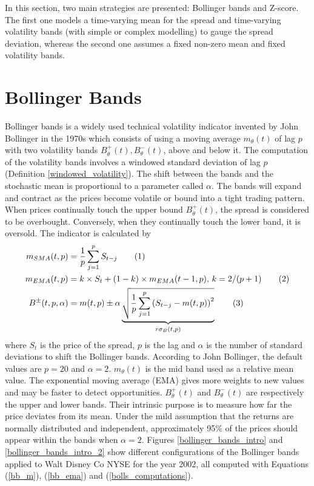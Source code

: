\documentclass[11pt,a4,twosided,singlespacing,titlepagenumber=on]{scrreprt}
\numberwithin{equation}{chapter} %
\theoremstyle{remark}
\newcommand\numberthis{\addtocounter{equation}{1}\tag{\theequation}}
\begin{document}
In this section, two main strategies are presented: Bollinger bands and Z-score. The first one models a time-varying mean for the spread and time-varying volatility bands (with simple or complex modelling) to gauge the spread deviation, whereas the second one assumes a fixed non-zero mean and fixed volatility bands.

\section{Bollinger Bands}
\label{sec:bollinger_bands}

Bollinger bands is a widely used technical volatility indicator invented by John Bollinger in the 1970s which consists of using a moving average $m_\theta(t)$ of lag $p$ with two volatility bands $B_\theta^+(t), B_\theta^-(t)$, above and below it. The computation of the volatility bands involves a windowed standard deviation of lag $p$ (Definition \ref{windowed_volatility}). The shift between the bands and the stochastic mean is proportional to a parameter called $\alpha$. The bands will expand and contract as the prices become volatile or bound into a tight trading pattern. When prices continually touch the upper bound $B_\theta^+(t)$, the spread is considered to be overbought. Conversely, when they continually touch the lower band, it is oversold. The indicator is calculated by
\begin{align*}
m_{SMA}(t,p) &= \frac{1}{p}\sum_{j=1}^p S_{t-j} \numberthis \label{bb_m} \\
m_{EMA}(t,p) &= k \times S_t + (1-k) \times m_{EMA}(t-1,p) \text{, } k = 2/(p+1) \numberthis \label{bb_ema} \\
B^\pm(t,p,\alpha) &= m(t,p) \pm \alpha \underbrace{\sqrt{\frac{1}{p} \sum_{j=1}^p \left(S_{t-j} - m(t,p) \right)^2}}_{r\sigma_B(t,p)} \numberthis \label{bolls_computations}
\end{align*}
where $S_t$ is the price of the spread, $p$ is the lag and $\alpha$ is the number of standard deviations to shift the Bollinger bands. According to John Bollinger, the default values are $p = 20$ and $\alpha = 2$. $m_\theta(t)$ is the mid band used as a relative mean value. The exponential moving average (EMA) gives more weights to new values and may be faster to detect opportunities. $B^+_\theta(t)$ and $B^-_\theta(t)$ are respectively the upper and lower bands. Their intrinsic purpose is to measure how far the price deviates from its mean. Under the mild assumption that the returns are normally distributed and independent, approximately 95\% of the prices should appear within the bands when $\alpha = 2$. Figures \ref{bollinger_bands_intro} and \ref{bollinger_bands_intro_2} show different configurations of the Bollinger bands applied to Walt Disney Co NYSE for the year 2002, all computed with Equations (\ref{bb_m}), (\ref{bb_ema}) and (\ref{bolls_computations}).
\end{document}
